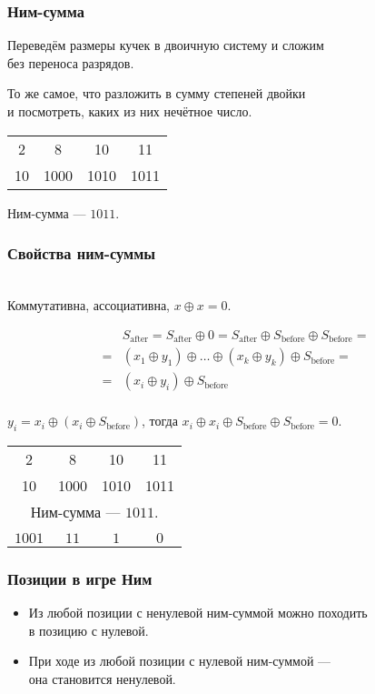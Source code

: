 \begin{frame} \frametitle{Ним-сумма}
	Переведём размеры кучек в двоичную систему и сложим \\
	без переноса разрядов.

	То же самое, что разложить в сумму степеней двойки \\
	и посмотреть, каких из них нечётное число. \medskip

\begin{center}\begin{tabular}{cccc}
2 & 8 & 10 & 11 \\
{\small 10} & {\small 1000} & {\small 1010} & {\small 1011}
\end{tabular}

Ним-сумма — $1011$. \end{center}
\end{frame}

\begin{frame} \frametitle{Свойства ним-суммы} \ \\ [-0.4cm]
	Коммутативна, ассоциативна, $x \oplus x = 0$. \vspace{-0.8cm}
\renewcommand{\sb}{S_{\text{before}}}
\newcommand{\sa}{S_{\text{after}}}

\begin{align*}
&	\sa = \sa \oplus 0 = \sa \oplus \sb \oplus \sb = \\
= &	(x_1 \oplus y_1) \oplus \ldots \oplus (x_k \oplus y_k) \oplus \sb = \\
= & (x_i \oplus y_i) \oplus \sb \\
\end{align*} \vspace{-1.3cm} \pause

$y_i = x_i \oplus (x_i \oplus \sb)$, тогда $x_i \oplus x_i \oplus \sb \oplus \sb = 0$. \pause

\begin{center}\begin{tabular}{cccc}
2 & 8 & 10 & 11 \\
{\small 10} & {\small 1000} & {\small 1010} & {\small 1011} \\
\multicolumn{4}{c}{Ним-сумма — $1011$.} \\ \pause
\phantom{ававав} & \phantom{ававав} & \phantom{ававав} & \phantom{ававав} \\
{\small $1001$} & {\small $11$} & {\small $1$} & {\small $0$} \\
\end{tabular} \end{center}
\end{frame}

\begin{frame} \frametitle{Позиции в игре Ним}
\begin{itemize} \itemsep=2.6mm
	\item Из любой позиции с ненулевой ним-суммой можно походить \\
	в позицию с нулевой.
	\item При ходе из любой позиции с нулевой ним-суммой — \\
	она становится ненулевой.
\end{itemize}
\end{frame}
